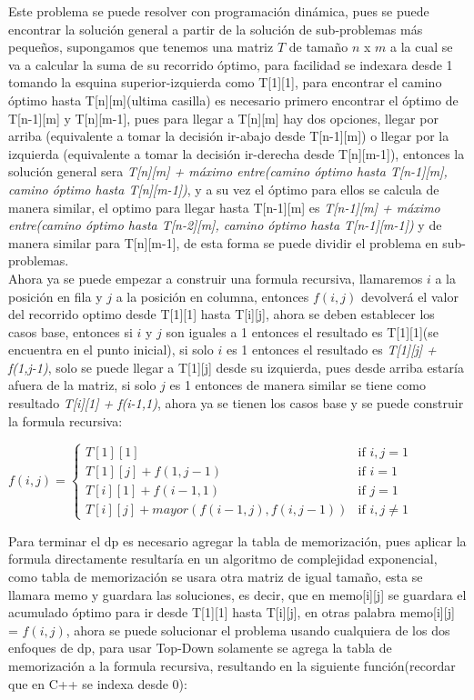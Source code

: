 \documentclass[12pt, a4paper]{article}
\newcommand\cppfile[2][]{

}
\begin{document}
	Este problema se puede resolver con programación dinámica, pues se puede encontrar la solución general a
	partir de la solución de sub-problemas más pequeños, supongamos	que tenemos una matriz $T$ de tamaño $n$ x $m$
	a la cual se va a calcular la suma de su recorrido óptimo, para facilidad se indexara desde 1 tomando
	la esquina superior-izquierda como T[1][1], para encontrar el camino óptimo hasta T[n][m](ultima casilla)
	es necesario primero encontrar el óptimo de T[n-1][m] y T[n][m-1], pues para llegar a T[n][m] hay dos opciones,
	llegar por arriba (equivalente a tomar la decisión ir-abajo desde T[n-1][m]) o llegar por la izquierda 
	(equivalente a tomar la decisión ir-derecha desde T[n][m-1]), entonces la solución general sera 
	\textit{T[n][m] + máximo entre(camino óptimo hasta T[n-1][m], camino óptimo hasta T[n][m-1])}, y a su vez
	el óptimo para ellos se calcula de manera similar, el optimo para llegar hasta T[n-1][m] es 
	\textit{T[n-1][m] + máximo entre(camino óptimo hasta T[n-2][m], camino óptimo hasta T[n-1][m-1])} y 
	de manera similar para T[n][m-1], de esta forma se puede dividir el problema en sub-problemas.\\
	
	Ahora ya se puede empezar a construir una formula recursiva, llamaremos $i$ a la posición en fila y $j$ a la 
	posición en columna, entonces $f(i,j)$ devolverá el valor del recorrido optimo desde T[1][1] hasta T[i][j], 
	ahora se deben establecer los casos base, entonces si $i$ y $j$ son iguales a 1 entonces el resultado es 
	T[1][1](se encuentra en el punto inicial), si solo $i$ es 1 entonces el resultado es \textit{T[1][j] + f(1,j-1)},
	solo se puede llegar a T[1][j] desde su izquierda, pues desde arriba estaría afuera de la matriz, si solo $j$ 
	es 1 entonces de manera similar se tiene como resultado \textit{T[i][1] + f(i-1,1)}, ahora ya se tienen los 
	casos base y se puede construir la formula recursiva:
	\begin{center}
		$f(i, j) = 	
		\begin{cases}
			T[1][1] & \text{if $i,j = 1$}\\
			T[1][j] + f(1, j-1) & \text{if $i = 1$}\\
			T[i][1] + f(i-1, 1) & \text{if $j = 1$}\\
			T[i][j] + mayor(f(i-1, j), f(i, j-1)) & \text{if $i,j \neq 1$}
		\end{cases}
	$\\
	\end{center}
	Para terminar el dp es necesario agregar la tabla de memorización, pues aplicar la formula directamente resultaría
	en un algoritmo de complejidad exponencial, como tabla de memorización se usara otra matriz de igual tamaño,
	esta se llamara memo y guardara las soluciones, es decir, que en memo[i][j] se guardara el acumulado óptimo para 
	ir desde T[1][1] hasta T[i][j], en otras palabra memo[i][j] = $f(i,j)$, ahora se puede solucionar el problema 
	usando cualquiera de los dos enfoques de dp, para usar Top-Down solamente se agrega la tabla de memorización 
	a la formula recursiva, resultando en la siguiente función(recordar que en C++ se indexa desde 0):
	\cppfile[9-20]{codigos/matriz.cpp}
	
\end{document}

